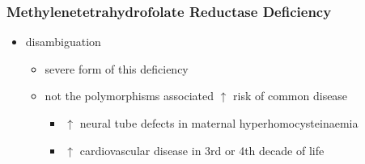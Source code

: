 \documentclass[12pt]{scrartcl}
\begin{document}
\subsubsection{Methylenetetrahydrofolate Reductase Deficiency}
\label{sec:org17423e7}
\begin{itemize}
\item disambiguation
\begin{itemize}
\item severe form of this deficiency
\item not the polymorphisms associated \(\uparrow\) risk of common disease
\begin{itemize}
\item \(\uparrow\) neural tube defects in maternal hyperhomocysteinaemia
\item \(\uparrow\) cardiovascular disease in 3rd or 4th decade of life
\end{itemize}
\end{itemize}
\end{itemize}
\end{document}
